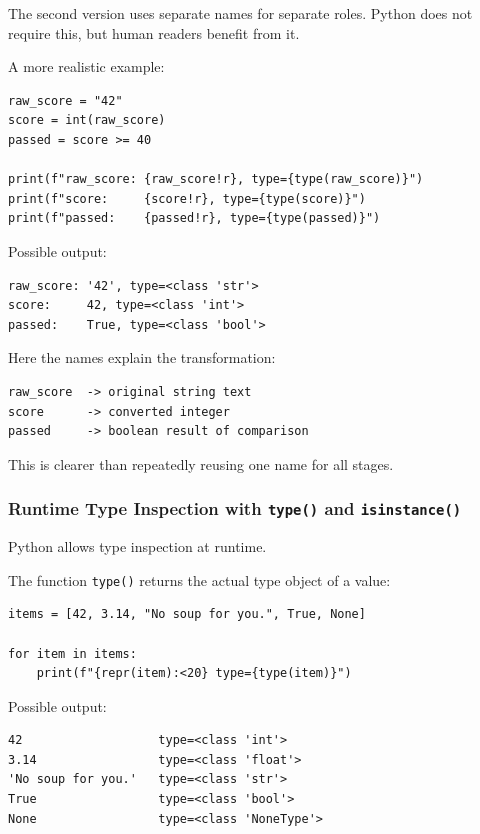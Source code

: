 The second version uses separate names for separate roles. Python does not require this, but human readers benefit from it.

A more realistic example:

\begin{verbatim}
raw_score = "42"
score = int(raw_score)
passed = score >= 40

print(f"raw_score: {raw_score!r}, type={type(raw_score)}")
print(f"score:     {score!r}, type={type(score)}")
print(f"passed:    {passed!r}, type={type(passed)}")
\end{verbatim}

Possible output:

\begin{verbatim}
raw_score: '42', type=<class 'str'>
score:     42, type=<class 'int'>
passed:    True, type=<class 'bool'>
\end{verbatim}

Here the names explain the transformation:

\begin{verbatim}
raw_score  -> original string text
score      -> converted integer
passed     -> boolean result of comparison
\end{verbatim}

This is clearer than repeatedly reusing one name for all stages.

\subsubsection{Runtime Type Inspection with \texttt{type()} and \texttt{isinstance()}}

Python allows type inspection at runtime.

The function \texttt{type()} returns the actual type object of a value:

\begin{verbatim}
items = [42, 3.14, "No soup for you.", True, None]

for item in items:
    print(f"{repr(item):<20} type={type(item)}")
\end{verbatim}

Possible output:

\begin{verbatim}
42                   type=<class 'int'>
3.14                 type=<class 'float'>
'No soup for you.'   type=<class 'str'>
True                 type=<class 'bool'>
None                 type=<class 'NoneType'>
\end{verbatim}

